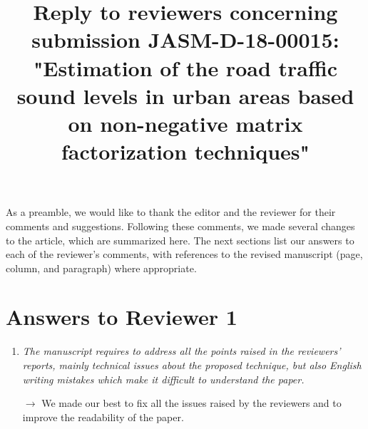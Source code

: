 \documentclass[10pt]{article}
\title{Reply to reviewers concerning submission JASM-D-18-00015: "Estimation of the road traffic sound levels in urban areas based on non-negative matrix factorization techniques"}
\begin{document}
\maketitle

As a preamble, we would like to thank the editor and the reviewer for their comments and suggestions. Following these comments, we made several changes to the article, which are summarized here. The next sections list our answers to each of the reviewer’s comments, with references to the revised manuscript (page, column, and paragraph) where appropriate.

\section{Answers to Reviewer 1}

\begin{enumerate}

\item \emph{The manuscript requires to address all the points raised in the reviewers' reports, mainly technical issues about the proposed technique, but also English writing mistakes which make it difficult to understand the paper.}

$\rightarrow$ We made our best to fix all the issues raised by the reviewers and to improve the readability of the paper.

\end{enumerate}
\end{document}
